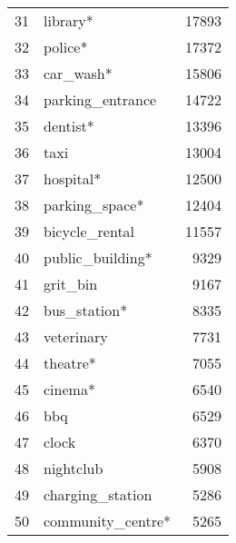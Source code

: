 \begin{tabular}{llr}
31   &           library* &   17893 \\
32   &            police* &   17372 \\
33   &          car\_wash* &   15806 \\
34   &   parking\_entrance &   14722 \\
35   &           dentist* &   13396 \\
36   &               taxi &   13004 \\
37   &          hospital* &   12500 \\
38   &     parking\_space* &   12404 \\
39   &     bicycle\_rental &   11557 \\
40   &   public\_building* &    9329 \\
41   &           grit\_bin &    9167 \\
42   &       bus\_station* &    8335 \\
43   &         veterinary &    7731 \\
44   &           theatre* &    7055 \\
45   &            cinema* &    6540 \\
46   &                bbq &    6529 \\
47   &              clock &    6370 \\
48   &          nightclub &    5908 \\
49   &   charging\_station &    5286 \\
50   &  community\_centre* &    5265 \\
\bottomrule
\end{tabular}
